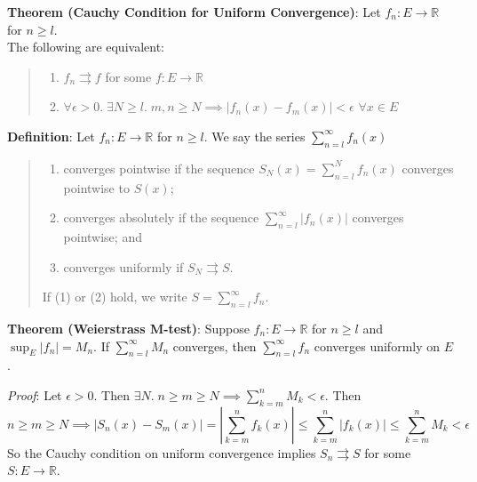 \documentclass[11pt]{article}
\begin{document}
\textbf{Theorem (Cauchy Condition for Uniform Convergence)}: Let $f_n : E \to \mathbb{R}$ for $n \geq l$.\\
The following are equivalent:
\begin{quote}\vspace{-0.3cm}
	\begin{enumerate}
	\item $f_n \rightrightarrows f$ for some $f : E \to \mathbb{R}$
	\item $\forall \epsilon > 0.\; \exists N \geq l.\; m,n \geq N \implies |f_n(x) - f_m(x)| < \epsilon$ $\forall x \in E$
	\end{enumerate}
\end{quote}

\textbf{Definition}: Let $f_n : E \to \mathbb{R}$ for $n \geq l$. We say the series $\sum_{n=l}^\infty f_n(x)$
\begin{quote}\vspace{-0.3cm}
	\begin{enumerate}
	\item converges pointwise if the sequence $S_N(x) = \sum_{n=l}^N f_n(x)$ converges pointwise to $S(x)$;
	\item converges absolutely if the sequence $\sum_{n=l}^\infty |f_n(x)|$ converges pointwise; and
	\item converges uniformly if $S_N \rightrightarrows S$.
	\end{enumerate}
	If (1) or (2) hold, we write $S = \sum_{n=l}^\infty f_n$.
\end{quote}

\textbf{Theorem (Weierstrass M-test)}: Suppose $f_n : E \to \mathbb{R}$ for $n \geq l$ and $\sup_E |f_n| = M_n$. If $\sum_{n=l}^\infty M_n$ converges, then $\sum_{n=l}^\infty f_n$ converges uniformly on $E$.

\emph{Proof}: Let $\epsilon > 0$. Then $\exists N.\; n \geq m \geq N \implies \sum_{k=m}^n M_k < \epsilon$. Then
\begin{displaymath}
n \geq m \geq N \implies |S_n(x) - S_m(x)| = \left|\sum_{k=m}^n f_k(x)\right| \leq \sum_{k=m}^n |f_k(x)| \leq \sum_{k=m}^n M_k < \epsilon
\end{displaymath}
So the Cauchy condition on uniform convergence implies $S_n \rightrightarrows S$ for some $S : E \to \mathbb{R}$.
\end{document}
